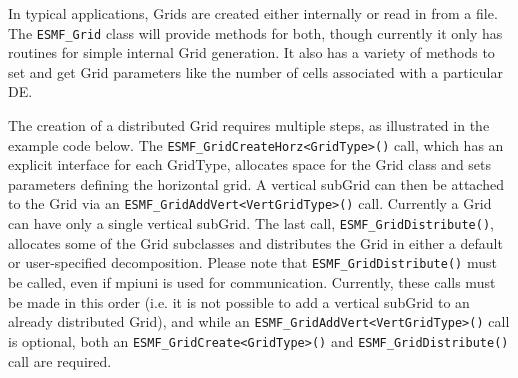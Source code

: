 


In typical applications, Grids are created either internally or read in from
a file.  The {\tt ESMF\_Grid} class will provide methods for both, though 
currently it only has routines for simple internal Grid generation.  It also
has a variety of methods to set and get Grid parameters like the number of cells
associated with a particular DE.  

The creation of a distributed Grid requires multiple steps, as
illustrated in the example code below.  The {\tt ESMF\_GridCreateHorz<GridType>()} call, which has an
explicit interface for each GridType, allocates space for the Grid class and sets
parameters defining the horizontal grid.  A vertical subGrid can then be attached
to the Grid via an {\tt ESMF\_GridAddVert<VertGridType>()} call.  Currently a Grid can have only a single
vertical subGrid.  The last call, {\tt ESMF\_GridDistribute()}, allocates some of
the Grid subclasses and distributes the Grid in either a default or
user-specified decomposition.  Please note that {\tt ESMF\_GridDistribute()} must
be called, even if mpiuni is used for communication.  Currently, these calls must
be made in this order (i.e. it is not possible to add a vertical subGrid to an
already distributed Grid), and while an {\tt ESMF\_GridAddVert<VertGridType>()} call
is optional, both an {\tt ESMF\_GridCreate<GridType>()} and
{\tt ESMF\_GridDistribute()} call are required.

